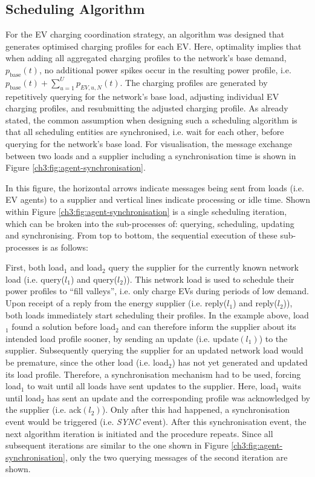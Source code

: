 \subsection{Scheduling Algorithm}
\label{ch3:subsec:scheduling-algorithm}

For the EV charging coordination strategy, an algorithm was designed that generates optimised charging profiles for each EV.
Here, optimality implies that when adding all aggregated charging profiles to the network's base demand, $p_\text{base}(t)$, no additional power spikes occur in the resulting power profile, i.e. $p_\text{base}(t) + \sum_{u=1}^U p_{EV,u,N}(t)$.
The charging profiles are generated by repetitively querying for the network's base load, adjusting individual EV charging profiles, and resubmitting the adjusted charging profile.
As already stated, the common assumption when designing such a scheduling algorithm is that all scheduling entities are synchronised, i.e. wait for each other, before querying for the network's base load.
For visualisation, the message exchange between two loads and a supplier including a synchronisation time is shown in Figure \ref{ch3:fig:agent-synchronisation}.



In this figure, the horizontal arrows indicate messages being sent from loads (i.e. EV agents) to a supplier and vertical lines indicate processing or idle time.
Shown within Figure \ref{ch3:fig:agent-synchronisation} is a single scheduling iteration, which can be broken into the sub-processes of: querying, scheduling, updating and synchronising.
From top to bottom, the sequential execution of these sub-processes is as follows:

First, both load$_1$ and load$_2$ query the supplier for the currently known network load (i.e. query($l_1$) and query($l_2$)).
This network load is used to schedule their power profiles to ``fill valleys'', i.e. only charge EVs during periods of low demand.
Upon receipt of a reply from the energy supplier (i.e. reply($l_1$) and reply($l_2$)), both loads immediately start scheduling their profiles.
In the example above, load$_1$ found a solution before load$_2$ and can therefore inform the supplier about its intended load profile sooner, by sending an update (i.e. update$(l_1)$) to the supplier.
Subsequently querying the supplier for an updated network load would be premature, since the other load (i.e. load$_2$) has not yet generated and updated its load profile.
Therefore, a synchronisation mechanism had to be used, forcing load$_1$ to wait until all loads have sent updates to the supplier.
Here, load$_1$ waits until load$_2$ has sent an update and the corresponding profile was acknowledged by the supplier (i.e. ack$(l_2)$).
Only after this had happened, a synchronisation event would be triggered (i.e. \textit{SYNC} event).
After this synchronisation event, the next algorithm iteration is initiated and the procedure repeats.
Since all subsequent iterations are similar to the one shown in Figure \ref{ch3:fig:agent-synchronisation}, only the two querying messages of the  second iteration are shown.

